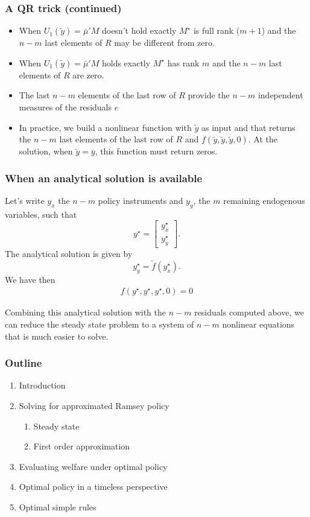 \documentclass{beamer}
\begin{document}
\begin{frame}
  \frametitle{A QR trick (continued)}
\begin{itemize}
\item When $U_1\left(\tilde y\right) = \bar\mu'M$ doesn't hold exactly $M^\star$ is full rank ($m+1$) and the $n-m$ last elements of $R$ may be different from zero. 
\item When $U_1\left(\tilde y\right) = \bar\mu'M$ holds exactly $M^\star$ has rank $m$ and the $n-m$ last elements of $R$
are zero.
\item The last $n-m$ elements of the last row of $R$ provide the $n-m$ independent measures of the residuals $e$
\item In practice, we build a nonlinear function with $\tilde y$ as input and that returns the $n-m$ last elements of the last row of $R$ and $f\left(\tilde y,\tilde y,\tilde y,0\right)$. At the solution, when $\tilde y = \bar y$, this function must return zeros. 
\end{itemize}
\end{frame}

\begin{frame}
\frametitle{When an analytical solution is available}
Let's write $y_x$ the $n-m$ policy instruments and $y_y$, the $m$ remaining endogenous variables, such that
\[
  y^\star = \left[\begin{array}{c}y_x^\star\\y_y^\star\end{array}\right].
\]
The analytical solution is given by
\[
  y_y^\star = \tilde f\left(y_x^\star\right).
\]
We have then
\begin{align*}
  f\left(y^\star,y^\star,y^\star,0\right) = 0
\end{align*}

Combining this analytical solution with the $n-m$ residuals computed above, we can reduce the steady state problem to a system of $n-m$ nonlinear equations that is much easier to solve.
\end{frame}

\begin{frame}
  \frametitle{Outline}
  \begin{enumerate}
  \item Introduction
  \item Solving for approximated Ramsey policy
    \begin{enumerate}
    \item Steady state
    \item {\red First order approximation}
    \end{enumerate}
  \item Evaluating welfare under optimal policy
  \item Optimal policy in a timeless perspective
  \item Optimal simple rules
  \end{enumerate}
\end{frame}
\end{document}
